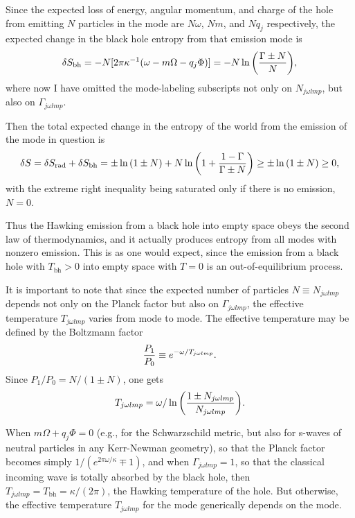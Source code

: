 \documentclass[12pt]{article} \usepackage{latexsym} \textwidth 15cm
\begin{document}
Since the expected loss of energy, angular momentum, and charge of the
hole from emitting $N$ particles in the mode are $N\omega$, $Nm$, and
$Nq_j$ respectively, the expected change in the black hole entropy
from that emission mode is
 \begin{equation}
 \delta S_{\mathrm{bh}} = - N [2\pi\kappa^{-1}(\omega-m\Omega-q_j\Phi)]
  = - N \ln{\left({\Gamma \pm N \over N}\right)},
 \label{eq:5c}
 \end{equation}
where now I have omitted the mode-labeling subscripts not only on
$N_{j\omega lmp}$, but also on $\Gamma_{j\omega lmp}$.

Then the total expected change in the entropy of the world from the
emission of the mode in question is
 \begin{equation}
 \delta S = \delta S_{\mathrm{rad}} + \delta S_{\mathrm{bh}}
  = \pm \ln{(1\pm N)} 
      +N\ln{\left(1+{1-\Gamma \over \Gamma \pm N} \right)}
          \ge \pm \ln{(1\pm N)} \ge 0,
 \label{eq:5d}
 \end{equation}
with the extreme right inequality being saturated only if there is no
emission, $N=0$.

Thus the Hawking emission from a black hole into empty space obeys the
second law of thermodynamics, and it actually produces entropy from
all modes with nonzero emission.  This is as one would expect, since
the emission from a black hole with $T_{\mathrm{bh}} > 0$ into empty
space with $T=0$ is an out-of-equilibrium process.

It is important to note that since the expected number of particles $N
\equiv N_{j\omega lmp}$ depends not only on the Planck
factor but also on $\Gamma_{j\omega lmp}$, the effective temperature
$T_{j\omega lmp}$ varies from mode to mode.  The effective temperature
may be defined by the Boltzmann factor
 \begin{equation}
 {P_1 \over P_0} \equiv e^{-\omega/T_{j\omega lmp}}.
 \label{eq:8}
 \end{equation}
Since $P_1/P_0 = N/(1\pm N)$, one gets
 \begin{equation}
 T_{j\omega lmp} = 
  \omega/\ln{\left({1\pm N_{j\omega lmp}
    \over N_{j\omega lmp}}\right)}.
 \label{eq:8b}
 \end{equation}

When $m\Omega+q_j\Phi = 0$ (e.g., for the Schwarzschild metric, but also
for s-waves of neutral particles in any Kerr-Newman geometry), so that
the Planck factor becomes simply $1/(e^{2\pi\omega/\kappa} \mp 1)$,
and when $\Gamma_{j\omega lmp} = 1$, so that the classical incoming
wave is totally absorbed by the black hole, then $T_{j\omega lmp} =
T_{\mathrm{bh}} = \kappa/(2\pi)$, the Hawking temperature of the hole.
But otherwise, the effective temperature $T_{j\omega lmp}$ for the
mode generically depends on the mode.
\end{document}
